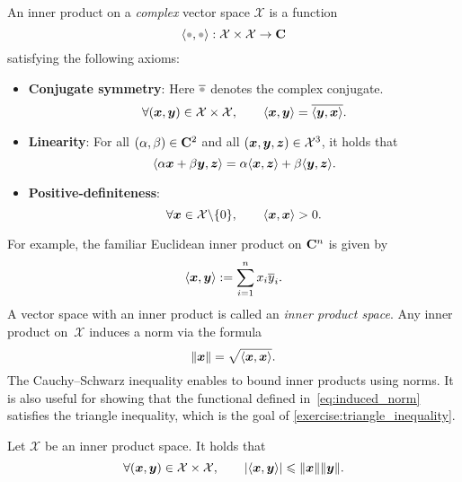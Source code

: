 \begin{definition}
    An inner product on a \emph{complex} vector space $\mathcal X$ is a function
    \[
        \ip{\placeholder,\placeholder}: \mathcal X \times \mathcal X \to \complex
    \]
    satisfying the following axioms:
    \begin{itemize}
        \item
            \textbf{Conjugate symmetry}:
            Here $\overline \placeholder$ denotes the complex conjugate.
            \[
                \forall (\mathbf{\boldsymbol{x}}, \mathbf{\boldsymbol{y}}) \in \mathcal X \times \mathcal X, \qquad
                \langle\mathbf{\boldsymbol{x}}, \mathbf{\boldsymbol{y}}\rangle = \overline{\langle\mathbf{\boldsymbol{y}}, \mathbf{\boldsymbol{x}}\rangle}.
            \]
        \item
            \textbf{Linearity}:
            For all $(\alpha, \beta) \in \mathbf C^2$ and all $(\mathbf{\boldsymbol{x}}, \mathbf{\boldsymbol{y}}, \mathbf{\boldsymbol{z}}) \in \mathcal X^3$,
            it holds that
            \[
                \langle\alpha \mathbf{\boldsymbol{x}} + \beta \mathbf{\boldsymbol{y}}, \mathbf{\boldsymbol{z}}\rangle
                = \alpha \langle\mathbf{\boldsymbol{x}}, \mathbf{\boldsymbol{z}}\rangle + \beta \langle\mathbf{\boldsymbol{y}}, \mathbf{\boldsymbol{z}}\rangle.
            \]

        \item
            \textbf{Positive-definiteness}:
            \[
                \forall \mathbf{\boldsymbol{x}} \in \mathcal X \backslash \{0\}, \qquad
                \langle\mathbf{\boldsymbol{x}}, \mathbf{\boldsymbol{x}}\rangle > 0.
            \]
    \end{itemize}
\end{definition}
For example, the familiar Euclidean inner product on $\mathbf C^n$ is given by
\[
    \langle\mathbf{\boldsymbol{x}}, \mathbf{\boldsymbol{y}}\rangle := \sum_{i=1}^{n} x_i \overline y_i.
\]
A vector space with an inner product is called an \emph{inner product space}.
Any inner product on~$\mathcal X$ induces a norm via the formula
\begin{equation}
    \label{eq:induced_norm}%
    \norm{\vect x} = \sqrt{\ip{\vect x, \vect x}}.
\end{equation}
The Cauchy--Schwarz inequality enables to bound inner products using norms.
It is also useful for showing that the functional defined in~\eqref{eq:induced_norm} satisfies the triangle inequality,
which is the goal of \cref{exercise:triangle_inequality}.
\begin{proposition}
    \label{proposition:cauchy_shwartz}
    Let $\mathcal X$ be an inner product space.
    It holds that
    \begin{equation}
        \label{eq:cauchy_shwartz}
        \forall  (\vect x, \vect y) \in \mathcal X \times \mathcal X, \qquad
        \abs[big]{\ip{\vect x, \vect y}} \leq \norm{\vect x} \norm{\vect y}.
    \end{equation}
\end{proposition}
